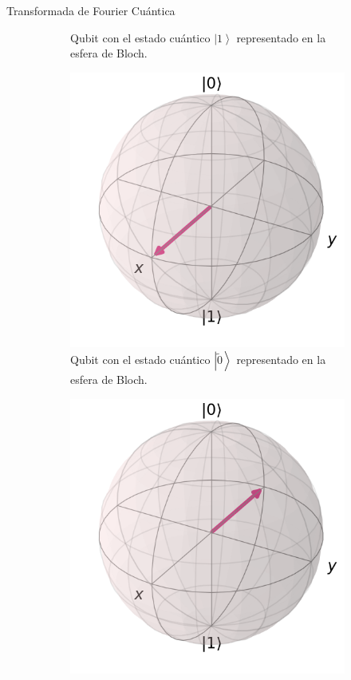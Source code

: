 \begin{frame}{Transformada de Fourier Cuántica}
\begin{figure}[H]
\begin{subfigure}{0.49\linewidth}
        \caption{Qubit con el estado cuántico $\left|1 \right\rangle$ representado en la esfera de Bloch.}
    \end{subfigure}
    \begin{subfigure}{0.49\linewidth}
        \centering
        \includegraphics[scale=0.125]{images/2.png}
        \caption{Qubit con el estado cuántico $\left|\tilde{0} \right\rangle$ representado en la esfera de Bloch.}
    \end{subfigure}
    \begin{subfigure}{0.49\linewidth}
        \centering
        \includegraphics[scale=0.125]{images/3.png}

\end{subfigure}
\end{figure}
\end{frame}

